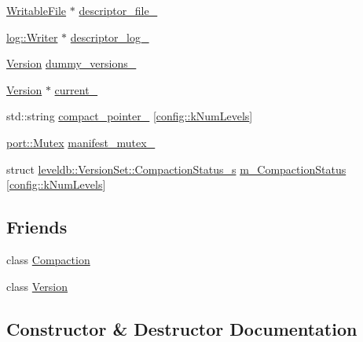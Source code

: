 \begin{DoxyCompactItemize}
\hyperlink{classleveldb_1_1_writable_file}{Writable\+File} $\ast$ \hyperlink{classleveldb_1_1_version_set_a8f3566876dcd58e6f19e41e2f21bf6f7}{descriptor\+\_\+file\+\_\+}
\item 
\hyperlink{classleveldb_1_1log_1_1_writer}{log\+::\+Writer} $\ast$ \hyperlink{classleveldb_1_1_version_set_af25ef8e67bd9f6f2c332e52c8861a280}{descriptor\+\_\+log\+\_\+}
\item 
\hyperlink{classleveldb_1_1_version}{Version} \hyperlink{classleveldb_1_1_version_set_a224414095181b4dd0ac3640a06f519d3}{dummy\+\_\+versions\+\_\+}
\item 
\hyperlink{classleveldb_1_1_version}{Version} $\ast$ \hyperlink{classleveldb_1_1_version_set_ac008aa680d0ce8de93158a46bf419d3d}{current\+\_\+}
\item 
std\+::string \hyperlink{classleveldb_1_1_version_set_ac5b2015d9ea267679a5c0ccbc177a846}{compact\+\_\+pointer\+\_\+} \mbox{[}\hyperlink{namespaceleveldb_1_1config_ab6017947ae68898c606643bddc0f5b9c}{config\+::k\+Num\+Levels}\mbox{]}
\item 
\hyperlink{classleveldb_1_1port_1_1_mutex}{port\+::\+Mutex} \hyperlink{classleveldb_1_1_version_set_ad466d8b969fea197af14cf0942ec5bbf}{manifest\+\_\+mutex\+\_\+}
\item 
struct \hyperlink{structleveldb_1_1_version_set_1_1_compaction_status__s}{leveldb\+::\+Version\+Set\+::\+Compaction\+Status\+\_\+s} \hyperlink{classleveldb_1_1_version_set_a8b8a0a0f0d7d62466dd86a3bae8724fe}{m\+\_\+\+Compaction\+Status} \mbox{[}\hyperlink{namespaceleveldb_1_1config_ab6017947ae68898c606643bddc0f5b9c}{config\+::k\+Num\+Levels}\mbox{]}
\end{DoxyCompactItemize}
\subsection*{Friends}
\begin{DoxyCompactItemize}
\item 
class \hyperlink{classleveldb_1_1_version_set_a9372e882b35d27c78356228e4b758917}{Compaction}
\item 
class \hyperlink{classleveldb_1_1_version_set_ace162f32d4abb584945d3a55a389b0a3}{Version}
\end{DoxyCompactItemize}


\subsection{Constructor \& Destructor Documentation}
\hypertarget{classleveldb_1_1_version_set_a9e57cec002caced94f5355bb705bd52d}{}
